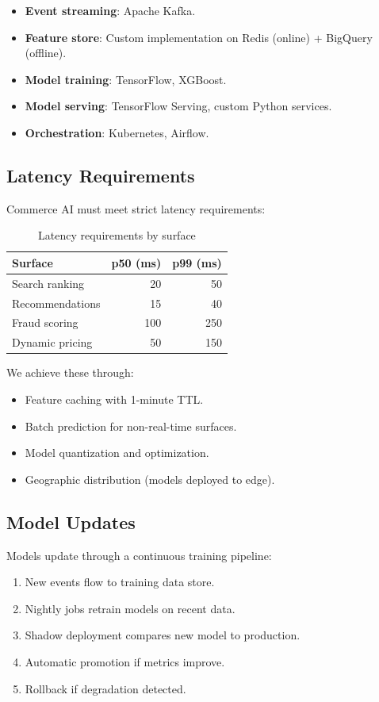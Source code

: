 \documentclass[11pt,twocolumn]{article}
\begin{document}
\begin{itemize}
\item \textbf{Event streaming}: Apache Kafka.
\item \textbf{Feature store}: Custom implementation on Redis (online) + BigQuery (offline).
\item \textbf{Model training}: TensorFlow, XGBoost.
\item \textbf{Model serving}: TensorFlow Serving, custom Python services.
\item \textbf{Orchestration}: Kubernetes, Airflow.
\end{itemize}

\subsection{Latency Requirements}

Commerce AI must meet strict latency requirements:

\begin{table}[h]
\centering
\caption{Latency requirements by surface}
\label{tab:latency}
\begin{tabular}{lrr}
\hline
Surface & p50 (ms) & p99 (ms) \\
\hline
Search ranking & 20 & 50 \\
Recommendations & 15 & 40 \\
Fraud scoring & 100 & 250 \\
Dynamic pricing & 50 & 150 \\
\hline
\end{tabular}
\end{table}

We achieve these through:
\begin{itemize}
\item Feature caching with 1-minute TTL.
\item Batch prediction for non-real-time surfaces.
\item Model quantization and optimization.
\item Geographic distribution (models deployed to edge).
\end{itemize}

\subsection{Model Updates}

Models update through a continuous training pipeline:

\begin{enumerate}
\item New events flow to training data store.
\item Nightly jobs retrain models on recent data.
\item Shadow deployment compares new model to production.
\item Automatic promotion if metrics improve.
\item Rollback if degradation detected.
\end{enumerate}
\end{document}
